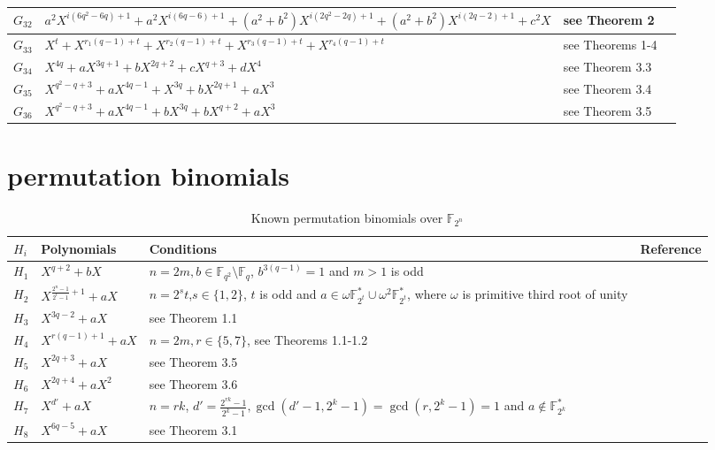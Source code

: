 \documentclass[12pt]{amsart}
\numberwithin{equation}{section}
\theoremstyle{definition}
\newcommand{\F}{\mathbb F}
\begin{document}
\begin{longtable}{|m{2em}|m{21em}|m{9em}|m{2em}|}
\hline
$G_{32}$& $a^2 X^{i(6q^2-6q)+1}+a^2 X^{i(6q-6)+1}+(a^2+b^2) X^{i(2q^2-2q)+1}+(a^2+b^2) X^{i(2q-2)+1}+c^2 X$ & see Theorem 2 & \cite{Shen} \\
\hline
$G_{33}$& $X^t +X^{r_1(q-1)+t} +X^{r_2(q-1)+t} +X^{r_3(q-1)+t} +X^{r_4(q-1)+t} $ & see Theorems 1-4 & \cite{KX} \\
\hline
$G_{34}$& $X^{4q}+aX^{3q+1} +bX^{2q+2} +cX^{q+3} +dX^{4} $ & see Theorem 3.3 & \cite{Rai} \\
\hline
$G_{35}$& $X^{q^2-q+3}+aX^{4q-1} +X^{3q} +bX^{2q+1} +aX^{3} $ & see Theorem 3.4 & \cite{Rai} \\
\hline
$G_{36}$& $X^{q^2-q+3}+aX^{4q-1} +bX^{3q} +bX^{q+2} +aX^{3} $ & see Theorem 3.5 & \cite{Rai} \\
\hline
\end{longtable}

 \section{permutation binomials}\label{bino}
\begin{longtable}{|m{3em}|m{10em}|m{15em}|m{4em}|}
\caption{Known permutation binomials over $\F_{2^{n}}$ \label{Table2}}\\
 \hline
$H_{i}$ & Polynomials & Conditions & Reference\\
\hline
$H_{1}$& $X^{q+2}+ b X$ & $n=2m, b \in \F_{q^2}\setminus\F_q$, $b^{3(q-1)}=1$ and $m>1$ is odd& \cite{BZ} \\
\hline
$H_{2}$& $X^{\frac{2^n-1}{2^t-1}+1}+ aX$ & $n=2^st$,$s \in \{1,2\}$, $t$ is odd and $a\in \omega \F_{2^{t}}^{*} \cup \omega^2 \F_{2^{t}}^{*}$, where $\omega$ is primitive third root of unity & \cite{BS} \\
\hline
$H_{3}$& $X^{3q-2}+ aX$ & see Theorem 1.1  & \cite{HL} \\
\hline
$H_{4}$& $X^{r(q-1)+1}+ aX$ & $n=2m, r\in\{5,7\}$, see Theorems 1.1-1.2 & \cite{LS} \\
\hline
$H_{5}$& $X^{2q+3}+ aX$ & see Theorem 3.5 & \cite{SG} \\
\hline
$H_{6}$& $X^{2q+4}+ aX^2$ & see Theorem 3.6 & \cite{SG} \\
\hline
$H_{7}$& $X^{d'}+aX$ & $n=rk$, $d'=\frac{2^{rk}-1}{2^k-1}, \gcd(d'-1,2^k-1)=\gcd(r,2^k-1)=1$ and $a \not \in \F_{2^k}^{*}$  & \cite{Wu} \\
\hline
$H_{8}$& $X^{6q-5}+aX$ & see Theorem 3.1  & \cite{LFW}\\
\hline
\end{longtable}
 
 
 
 
 
 
 
 
 
\end{document}
